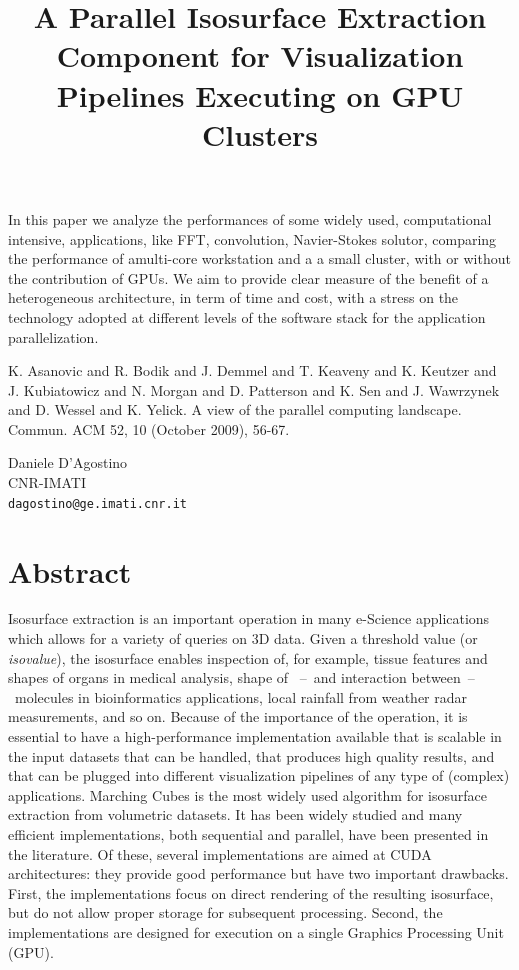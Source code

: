 \documentclass[article, A4, 11pt]{llncs}%
\begin{document}
In this paper we analyze the performances of some widely used, computational intensive, applications, like FFT, convolution, Navier-Stokes solutor,  comparing the performance of amulti-core workstation and a  a small cluster, with or without the contribution of GPUs. We aim to provide clear measure of the benefit of a heterogeneous architecture, in term of time and cost, with a stress on the technology adopted at different levels of the software stack for the application parallelization.



\begin{thebibliography}{10}
{\sc K. Asanovic and R. Bodik and J. Demmel and T. Keaveny and K. Keutzer and J. Kubiatowicz and N. Morgan and D. Patterson and K. Sen and J. Wawrzynek and D. Wessel and K. Yelick}. {A view of the parallel computing landscape}. Commun. ACM 52, 10 (October 2009), 56-67.
\end{thebibliography} %

\title{A Parallel Isosurface Extraction Component for Visualization Pipelines Executing on GPU Clusters}
 \author{} \institute{}
\maketitle
\begin{center}
{\large Daniele D'Agostino}\\
CNR-IMATI\\
{\tt dagostino@ge.imati.cnr.it}
\end{center}

\section*{Abstract}
Isosurface extraction is an important operation in many e-Science applications which allows for a variety of queries on 3D data. Given a threshold value (or \emph{isovalue}), the isosurface enables inspection of, for example, tissue features and shapes of organs in medical analysis, shape of ~--~and interaction between~--~molecules in bioinformatics applications, local rainfall from weather radar measurements, and so on. Because of the importance of the operation, it is essential to have a high-performance implementation available that is scalable in the input datasets that can be handled, that produces high quality results, and that can be plugged into different visualization pipelines of any type of (complex) applications. Marching Cubes is the most widely used algorithm for isosurface extraction from volumetric datasets. It has been widely studied and many efficient implementations, both sequential and parallel, have been presented in the literature. Of these, several implementations are aimed at CUDA architectures: they provide good performance but have two important drawbacks. First, the implementations focus on direct rendering of the resulting isosurface, but do not allow proper storage for subsequent processing. Second, the implementations are designed for execution on a single Graphics Processing Unit (GPU). 
\end{document}
